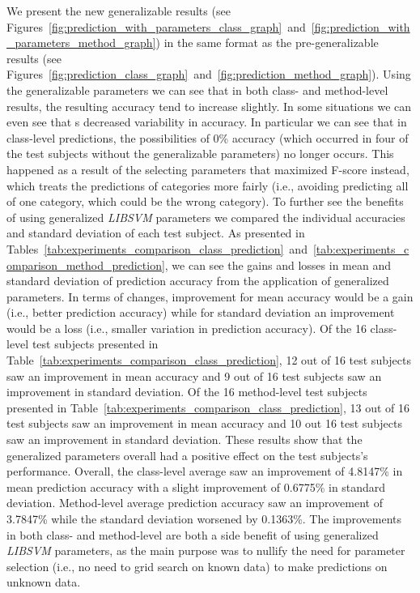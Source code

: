 We present the new generalizable results (see Figures~\ref{fig:prediction_with_parameters_class_graph}~and~\ref{fig:prediction_with_parameters_method_graph}) in the same format as the pre-generalizable results (see Figures~\ref{fig:prediction_class_graph}~and~\ref{fig:prediction_method_graph}). Using the generalizable parameters we can see that in both class- and method-level results, the resulting accuracy tend to increase slightly. In some situations we can even see that s decreased variability in accuracy. In particular we can see that in class-level predictions, the possibilities of 0\% accuracy (which occurred in four of the test subjects without the generalizable parameters) no longer occurs. This happened as a result of the selecting parameters that maximized F-score instead, which treats the predictions of categories more fairly (i.e., avoiding predicting all of one category, which could be the wrong category). To further see the benefits of using generalized \emph{LIBSVM} parameters we compared the individual accuracies and standard deviation of each test subject. As presented in Tables~\ref{tab:experiments_comparison_class_prediction}~and~\ref{tab:experiments_comparison_method_prediction}, we can see the gains and losses in mean and standard deviation of prediction accuracy from the application of generalized parameters. In terms of changes, improvement for mean accuracy would be a gain (i.e., better prediction accuracy) while for standard deviation an improvement would be a loss (i.e., smaller variation in prediction accuracy). Of the 16 class-level test subjects presented in Table~\ref{tab:experiments_comparison_class_prediction}, 12 out of 16 test subjects saw an improvement in mean accuracy and 9 out of 16 test subjects saw an improvement in standard deviation. Of the 16 method-level test subjects presented in Table~\ref{tab:experiments_comparison_class_prediction}, 13 out of 16 test subjects saw an improvement in mean accuracy and 10 out 16 test subjects saw an improvement in standard deviation. These results show that the generalized parameters overall had a positive effect on the test subjects's performance. Overall, the class-level average saw an improvement of 4.8147\% in mean prediction accuracy with a slight improvement of 0.6775\% in standard deviation. Method-level average prediction accuracy saw an improvement of 3.7847\% while the standard deviation worsened by 0.1363\%. The improvements in both class- and method-level are both a side benefit of using generalized \emph{LIBSVM} parameters, as the main purpose was to nullify the need for parameter selection (i.e., no need to grid search on known data) to make predictions on unknown data.

